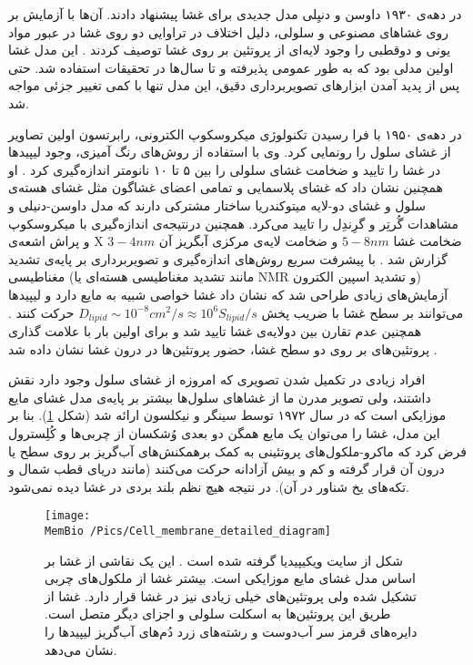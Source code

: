 در دهه‌ی ۱۹۳۰ داوسن 
و دنیِلی 
مدل جدیدی برای غشا پیشنهاد دادند. آن‌ها با آزمایش بر روی غشا‌های مصنوعی و سلولی، دلیل اختلاف در تراوایی دو روی غشا در عبور مواد یونی و دوقطبی را وجود لایه‌ای از پروتئین بر روی غشا توصیف کردند
\cite{Danielli1935}. 
این مدل غشا اولین مدلی بود که به طور عمومی پذیرفته  و تا سال‌ها  در تحقیقات استفاده شد. حتی پس از  پدید آمدن ابزار‌های تصویر‌برداری دقیق، این مدل تنها با کمی تغییر جزئی مواجه شد.

در دهه‌ی ۱۹۵۰ با فرا رسیدن تکنولوژی میکروسکوپ الکترونی، رابرتسون
 اولین تصاویر از غشای سلول را رونمایی کرد. وی با استفاده از روش‌های رنگ آمیزی، وجود لیپید‌ها
 در غشا را تایید و ضخامت غشای سلولی را بین ۵ تا ۱۰ نانومتر اندازه‌گیری کرد
\cite{ROBERTSON1959aa}.
او همچنین نشان داد که غشای پلاسمایی و تمامی اعضای غشاگون مثل غشای هسته‌ی سلول و غشای دو-لایه میتوکندریا
ساختار مشترکی دارند که مدل داوسن-دنیلی و مشاهدات گُرتِر و گرِندِل را تایید می‌کرد.
همچنین درنتیجه‌ی اندازه‌گیری با میکروسکوپ و پراش اشعه‌ی X ضخامت غشا 
 $5-8nm$
و ضخامت لایه‌ی مرکزی آبگریز آن
 $3-4nm$
گزارش شد
\cite{NelsonBook2004}.
با پیشرفت سریع روش‌های اندازه‌گیری و تصویربرداری بر پایه‌ی تشدید مغناطیسی (مانند تشدید مغناطیسی‌ هسته‌ای یا NMR
و تشدید اسپین الکترون) آزمایش‌های زیادی طراحی شد که نشان داد غشا  خواصی شبیه به مایع دارد
\cite{Edidin2003}
و لیپید‌ها می‌توانند بر سطح غشا با ضریب پخش
$D_{lipid}\sim 10^{-8}cm^2/s\approx 10^6S_{lipid}/s$
 حرکت کنند
\cite{NelsonBook2004,Chapman1975}.
همچنین عدم تقارن بین دولایه‌ی غشا تایید شد و برای اولین بار با علامت گذاری پروتئین‌های بر روی دو سطح غشا، حضور پروتئین‌ها در درون غشا نشان داده شد
\cite{Bretscher1973}.



افراد زیادی در تکمیل شدن تصویری که امروزه از غشای سلول وجود دارد نقش داشتند، ولی تصویر مدرن ما از غشاهای سلول‌ها بیشتر بر پایه‌ی مدل غشای مایع موزایکی‌
 است که در سال ۱۹۷۲ توسط سینگر
  و نیکلسون
 ارائه شد
\cite{Singer1972}
(شکل 
\ref{fig:fluidmembranemodel}). بنا بر این مدل، غشا را می‌توان یک مایع همگن دو بعدی وُشکسان از چربی‌ها و کُلِسترول فرض کرد که ماکرو-ملکول‌های پروتئینی به کمک برهمکنش‌های آب‌گریز  بر روی سطح یا درون آن قرار گرفته و کم و بیش آزادانه حرکت می‌کنند (مانند دریای قطب شمال و تکه‌های یخ  شناور در آن).  در نتیجه هیچ نظم بلند بردی در غشا دیده نمی‌شود. 

\begin{figure}[h]
\begin{center}
\texttt{[image: \\MemBio /Pics/Cell\_membrane\_detailed\_diagram]}
\caption{
شکل از سایت ویکیپیدیا گرفته شده است
\cite{wikiCellMembrane}. این یک نقاشی از غشا بر اساس مدل غشای مایع موزایکی است. بیشتر غشا از ملکول‌های چربی تشکیل شده ولی پروتئین‌های خیلی زیادی نیز در غشا قرار دارد.  غشا از طریق این پروتئین‌ها به اسکلت سلولی و اجزای دیگر متصل است. دایره‌های قرمز سر آب‌دوست و رشته‌های زرد دُم‌های آب‌گریز لیپید‌ها را نشان می‌دهد.
}
\label{fig:fluidmembranemodel}
\end{center}
\end{figure}



